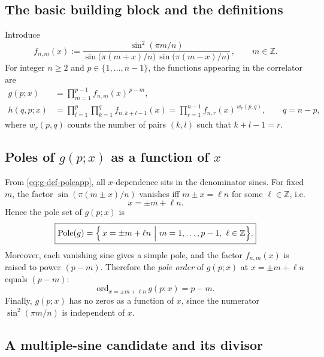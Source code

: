 \documentclass[11pt]{article}
\begin{document}
  \subsection*{The basic building block and the definitions}

  Introduce
  \begin{equation}
    f_{n,m}(x) :=\frac{\sin^{2}(\pi m/n)}{\sin\!\bigl(\pi(m+x)/n\bigr)\,\sin\!\bigl(\pi(m-x)/n\bigr)}
    \,, \qquad m\in\mathbb{Z}.
  \end{equation}
  For integer $n\ge 2$ and $p\in\{1,\dots,n-1\}$, the functions appearing in the
  correlator are
  \begin{align}
    g(p;x)   & =\prod_{m=1}^{p-1}f_{n,m}(x)^{\,p-m}, \label{eq:g-def-poleapp}                                                                  \\[2pt]
    h(q,p;x) & =\prod_{l=1}^{p}\prod_{k=1}^{q}f_{n,k+l-1}(x) =\prod_{r=1}^{n-1}f_{n,r}(x)^{\,w_r(p,q)}, \qquad q=n-p, \label{eq:h-def-poleapp}
  \end{align}
  where $w_{r}(p,q)$ counts the number of pairs $(k,l)$ such that $k+l-1=r$.

  \subsection*{Poles of $g(p;x)$ as a function of $x$}

  From \eqref{eq:g-def-poleapp}, all $x$-dependence sits in the denominator
  sines. For fixed $m$, the factor $\sin(\pi(m\pm x)/n)$ vanishes iff
  $m\pm x=\ell n$ for some $\ell\in\mathbb{Z}$, i.e.
  \begin{equation}
    x=\pm m+\ell n.
  \end{equation}
  Hence the pole set of $g(p;x)$ is
  \begin{equation}
    \boxed{ \mathrm{Pole}(g)=\Bigl\{\,x=\pm m+\ell n\ \Big|\ m=1,\dots,p-1,\ \ell\in\mathbb{Z}\Bigr\}. }
  \end{equation}
  Moreover, each vanishing sine gives a simple pole, and the factor $f_{n,m}(x)$
  is raised to power $(p-m)$. Therefore the \emph{pole order} of $g(p;x)$ at
  $x=\pm m+\ell n$ equals $(p-m)$:
  \begin{equation}
    \boxed{ \mathrm{ord}_{x=\pm m+\ell n}\, g(p;x)=p-m. }
  \end{equation}
  Finally, $g(p;x)$ has no zeros as a function of $x$, since the numerator $\sin^{2}
  (\pi m/n)$ is independent of $x$.

  \subsection*{A multiple-sine candidate and its divisor}
\end{document}
